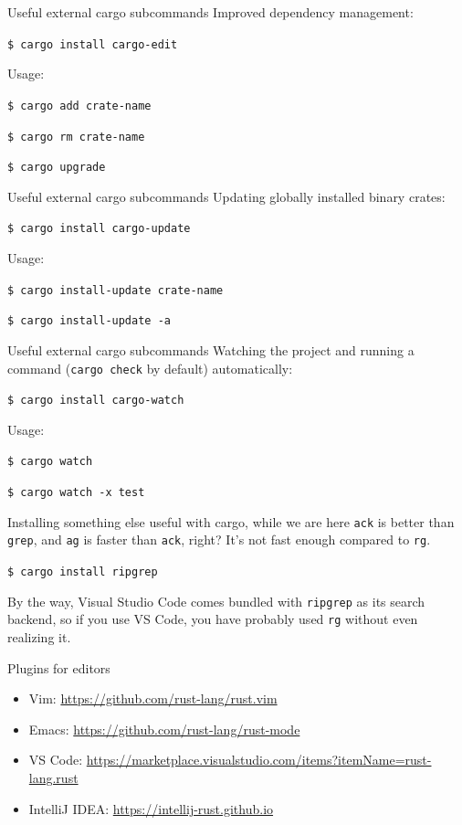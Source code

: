 \documentclass[12pt, aspectratio=169]{beamer}
\begin{document}
\begin{frame}{Useful external cargo subcommands}
  Improved dependency management:

  \texttt{\$ cargo install cargo-edit}

  Usage:

  \texttt{\$ cargo add crate-name}

  \texttt{\$ cargo rm crate-name}

  \texttt{\$ cargo upgrade}
\end{frame}

\begin{frame}{Useful external cargo subcommands}
  Updating globally installed binary crates:

  \texttt{\$ cargo install cargo-update}

  Usage:

  \texttt{\$ cargo install-update crate-name}

  \texttt{\$ cargo install-update -a}
\end{frame}

\begin{frame}{Useful external cargo subcommands}
  Watching the project and running a command (\texttt{cargo check} by default)
  automatically:

  \texttt{\$ cargo install cargo-watch}

  Usage:

  \texttt{\$ cargo watch}

  \texttt{\$ cargo watch -x test}
\end{frame}

\begin{frame}{Installing something else useful with cargo, while we are here}
  \texttt{ack} is better than \texttt{grep}, and \texttt{ag} is faster than
  \texttt{ack}, right? It's not fast enough compared to \texttt{rg}.

  \texttt{\$ cargo install ripgrep}

  By the way, Visual Studio Code comes bundled with \texttt{ripgrep} as its
  search backend, so if you use VS Code, you have probably used \texttt{rg}
  without even realizing it.
\end{frame}

\begin{frame}{Plugins for editors}
  \begin{itemize}
    \item Vim: \url{https://github.com/rust-lang/rust.vim}
    \item Emacs: \url{https://github.com/rust-lang/rust-mode}
    \item VS Code: \url{https://marketplace.visualstudio.com/items?itemName=rust-lang.rust}
    \item IntelliJ IDEA: \url{https://intellij-rust.github.io}
  \end{itemize}
\end{frame}
\end{document}
